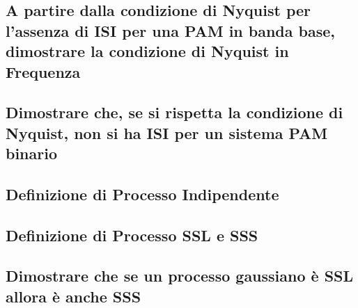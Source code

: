 \documentclass[12pt,oneside,openany]{memoir}
\numberwithin{equation}{subsection}
\begin{document}
\newpage
\subsection{A partire dalla condizione di Nyquist per l'assenza di ISI per una
PAM in banda base, dimostrare la condizione di Nyquist in Frequenza}


\subsection{Dimostrare che, se si rispetta la condizione di Nyquist, non si ha
ISI per un sistema PAM binario}


\newpage
\subsection{Definizione di Processo Indipendente}


\newpage
\subsection{Definizione di Processo SSL e SSS}


\newpage
\subsection{Dimostrare che se un processo gaussiano \`e SSL allora \`e anche
SSS}

\end{document}
